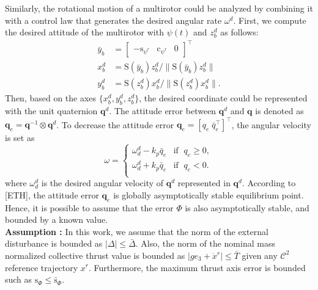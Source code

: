 \documentclass[letterpaper, 10 pt, conference]{ieeeconf}  %
\begin{document}
Similarly, the rotational motion of a multirotor could be analyzed by combining it with a control law that generates the desired angular rate $\omega^d$. 
First, we compute the desired attitude of the multirotor with $\psi(t)$ and $z_b^d$ as follows:
\begin{align}
\bar{y}_b &= [\begin{array}{ccc}-\text{s}_{\psi^r}&\text{c}_{\psi^r}&0\end{array}]^\intercal \nonumber \\
x_b^d &= \text{S}(\bar{y}_b)z_b^d / \|\text{S}(\bar{y}_b)z_b^d \| \nonumber \\ 
y_b^d &= \text{S}({z}_b^d)x_b^d / \|\text{S}(z_b^d)x_b^d \|. \nonumber  
\end{align}
Then, based on the axes $\{x_b^d,y_b^d,z_b^d\}$, the desired coordinate could be represented with the unit quaternion $\textbf{q}^d$. 
The attitude error between $\textbf{q}^d$ and $\textbf{q}$ is denoted as $\textbf{q}_e = \textbf{q}^{-1}\otimes \textbf{q}^d$. To decrease the attitude error $\textbf{q}_e = [q_e\;\bar{q}_e^\intercal]^\intercal$, the angular velocity is set as 
\begin{equation}
\omega = \left\{
\begin{array}{ll}
\omega_d^d - k_p \bar{q}_e & \text{if  }\;q_e \geq 0, \\ 
\omega_d^d + k_p \bar{q}_e & \text{if  }\;q_e < 0. \\ 
\end{array}
\right.
\end{equation}
where $\omega_d^d$ is the desired angular velocity of $\textbf{q}^d$ represented in $\textbf{q}^d$.
According to [ETH], the attitude error $\textbf{q}_e$ is globally asymptotically stable equilibrium point. 
Hence, it is possible to assume that the error $\Phi$ is also asymptotically stable, and bounded by a known value.
\\
\textbf{Assumption : }
In this work, we assume that the norm of the external disturbance is bounded as $|\Delta| \leq \bar{\Delta}$. 
Also, the norm of the nominal mass normalized collective thrust value is bounded as $|ge_3 + \ddot{x}^r| \leq \bar{T}$ given any $\mathcal{C}^2$ reference trajectory $x^r$.  
Furthermore, the maximum thrust axis error is bounded such as $\text{s}_\Phi \leq \bar{\text{s}}_\Phi$.
\end{document}
